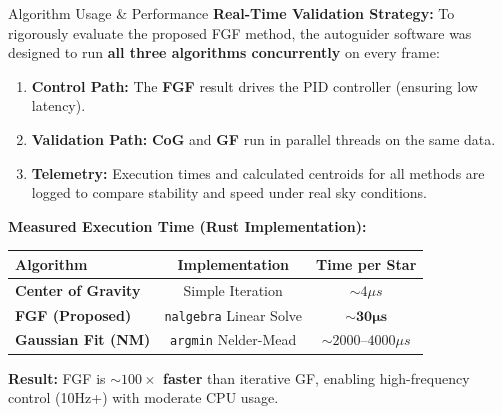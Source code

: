 \begin{frame}{Algorithm Usage \& Performance}
    \textbf{Real-Time Validation Strategy:}
    To rigorously evaluate the proposed FGF method, the autoguider software was designed to run \textbf{all three algorithms concurrently} on every frame:
    
    \begin{enumerate}
        \item \textbf{Control Path:} The \textbf{FGF} result drives the PID controller (ensuring low latency).
        \item \textbf{Validation Path:} \textbf{CoG} and \textbf{GF} run in parallel threads on the same data.
        \item \textbf{Telemetry:} Execution times and calculated centroids for all methods are logged to compare stability and speed under real sky conditions.
    \end{enumerate}

    \vspace{0.2cm}
    \textbf{Measured Execution Time (Rust Implementation):}
    \begin{table}
        \centering
        \begin{tabular}{l c c}
            \toprule
            \textbf{Algorithm} & \textbf{Implementation} & \textbf{Time per Star} \\
            \midrule
            \textbf{Center of Gravity} & Simple Iteration & $\sim 4 \mu s$ \\
            \textbf{FGF (Proposed)} & \texttt{nalgebra} Linear Solve & $\sim \mathbf{30 \mu s}$ \\
            \textbf{Gaussian Fit (NM)} & \texttt{argmin} Nelder-Mead & $\sim 2000 \text{--} 4000 \mu s$ \\
            \bottomrule
        \end{tabular}
    \end{table}
    
    \vspace{0.1cm}
    \small
    \textbf{Result:} FGF is \textbf{$\sim 100\times$ faster} than iterative GF, enabling high-frequency control (10Hz+) with moderate CPU usage.
\end{frame}

